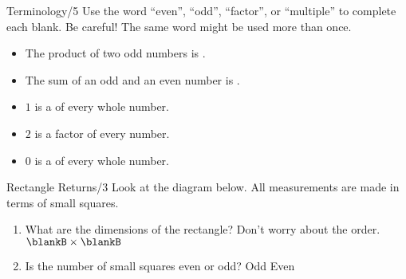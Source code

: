 \documentclass[12pt,letterpaper]{article}
\begin{document}
\begin{problem}{Terminology\hfill/5}
 Use the word ``even'', ``odd'', ``factor'', or ``multiple'' to complete each
 blank. Be careful! The same word might be used more than once.

 \begin{itemize}
  \item The product of two odd numbers is \underline{\hspace{6em}}.
  \item The sum of an odd and an even number is \underline{\hspace{6em}}.
  \item $1$ is a \underline{\hspace{6em}} of every whole number.
  \item $2$ is a factor of every \underline{\hspace{6em}} number.
  \item $0$ is a \underline{\hspace{6em}} of every whole number.
 \end{itemize}

\end{problem}

\begin{problem}{Rectangle Returns\hfill/3}
 Look at the diagram below. All measurements are made in terms of small squares.

 \begin{center}
 \end{center}

 \begin{enumerate}
  \item What are the dimensions of the rectangle? Don't worry about the order.
  \hfill \(\blankB\times\blankB\)
  \item Is the number of small squares even or odd? \hfill Odd \hspace{1em}
  Even
 \end{enumerate}
\end{problem}
\end{document}
